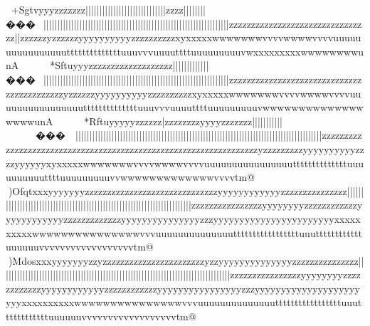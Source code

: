 {{{{{{{{{{{{{{{{{{{{{{{{{{{{{{{{{{{{{{{{{{{{{{{{{{{+Sgtvyyyzzzzzzz{|}||||||||||||||||||||||||||||{{{{{{{{zzzz{{{{{{{{{{{{{{{{||||||{{{{|}}}}}}}}}|}���~}}}}}}}}}}}}}}}||||}}}}}}}}||||}}}}||||||||||||{{{{{{}}}}}}}}}}}}}}||||||||}}}}}}}}}}}}||||||||||||||||{{{{{{{{||||||||}}}}}}}}||||||||}}}}||||}}}}}}|||{{{{{{{zzzzzzzz{{{{zzzzzzzzzzzz{{{{{{{{{{{{zzzzzzzzzzzz{{{{{{{{||{{{{{{{{zzzzzzyzzz{{{zzzyyyyyyyyyyzzzzzzzzzzxyxxxxxwwwwwwwvvvvwwwwvvvvuuuuuuuuuuuuuuuuttttttttttttttuuuvvvuuuuttttuuuuuuuuuvwxxxxxxxxxwwwwwwwwunA	*Sftuyyyzzzzzzz{{}{{{{{{{{{{{{{{{{{{{{{{{{{{{{zzzzzzzzzzzz{{{{{{{{{{{{{{{{||||||{{{{||||||}}}}|}���~}}}}}}}}}}}}}}}||||}}}}}}}}||||}}}}||||||||||||{{{{{{}}}}}}}}}}}}}}||||||||}}}}}}}}}}}}||||||||||||||||{{{{{{{{||||||||}}}}}}}}||||||||}}}}||||}}}}}}|||{{{{{{{zzzzzzzz{{{{zzzzzzzzzzzz{{{{{{{{{{{{zzzzzzzzzzzz{{{{{{{{{{{{{zzzzzzzzzzzyzzz{{{zzzyyyyyyyyyyzzzzzzzzzzxyxxxxxwwwwwwwvvvvwwwwvvvvuuuuuuuuuuuuuuuuttttttttttttttuuuvvvuuuuttttuuuuuuuuuvwwwwwwwwwwwwwwwwwwunA	*Rftuyyyyyzzzzzz{|{{{{{{{{{{{{{{{{{{{{{{{{{{{{zzzzzzzzyyyyzzzzzzz{{{{{{{{{{{{{{{{{{{{|||||||||||~~~~~~���~~}}}}}}}}}}}}}}}||||}}}}}}}}||||}}||||||||||||||{{{{{{||||||||||}}}}||||||||}}}}}}}}}}}}||||||||||||||||{{{{{{{{||||||||}}}}}}}}|||||||||||||||||||||||||{{{{{{{zzzzzzzz{{{{zzzzzzzzzzzzzzzzzzzzzzzzzzzzzzzzzzzzzzzzzzzz{{zzzzzzzzzzzzzzyzzzzzzzzzyyyyyyyyyyzzzzyyyyyyxyxxxxxwwwwwwwvvvvwwwwvvvvuuuuuuuuuuuuuuuuttttttttttttttuuuuuuuuuuttttuuuuuuuuuvvwwwwwwwwwwwwwvvvvtm@
)Ofqtxxxyyyyyyyzz{zzzzzzzzzzzzzzzzzzzzzzzzzzzzyyyyyyyyyyyyzzzzzzzzzzz{{{{{{{{{{{zzzz{{{{{{||||{|}}}}}}}}}}}}}}}}}}}}}}}}}}}}}}}}}}}}}}}}}|||||{{{{{{{{{{{{{{{{{{||||||||||||||||||||||||||||||||||||||||||||||||||{{{{{{{{}}}}}}}}}}}}}}}|||{{{{{{||||{{{{||||||{{{{{{{{{{zzzzzzzzzzzzzzzzyyyyyyyyzzzzzzzzzzzzyyyyyyyyyyyyzzzzzzzzzzzzzyyyyyyyyyyyyyyyzzzyyyyyyyyyyyyyyyyyyyyyyyxxxxxxxxxxwwwwwwwwwwwwwwwvvvuuuuuuuuuuuuuutttttttttttttttttuuuttttttttttttuuuuuuvvvvvvvvvvvvvvvvvvtm@
)Mdosxxxyyyyyyyzzyzzzzzzzzzzzzzzzzzzzzzzzyzzyyyyyyyyyyyyyyzzzzzzzzzzz{{{{{{{{{{{zzzz{{{{{{||||{|{{{{{{{{||}}}}}}}}}}}}}}}}}}}}}}}}}}}}}}}|||||{{{{{{{{{{{{{{{{{{||||||||||||||||||||||||||||||||||||||||||||||||||||||||||}}}}}}}}}}}}}}}|||{{{{{{||||{{{{||||||{{{{{{{{{{zzzzzzzzzzzzzzzzyyyyyyyyzzzzzzzzzzzzyyyyyyyyyyyyzzzzzzzzzzzzyyyyyyyyyyyyyyyyzzzyyyyyyyyyyyyyyyyyyyyyyyxxxxxxxxxxwwwwwwwwwwwwwwwvvvuuuuuuuuuuuuuutttttttttttttttttuuuttttttttttttuuuuuuvvvvvvvvvvvvvvvvvvtm@
}}}}}}}}}}}}}}}}}}}}}}}}}}}}}}}}}}}}}}}}}}}}}}}}}}}}}}}}}}}}}}}}}}}}}}}}}}}}}}}}}}}}}}}}}}}}}}}}}}}}}}}}}}}}}}}}}}}}}}}}}}}}}}}}}}}}}}
